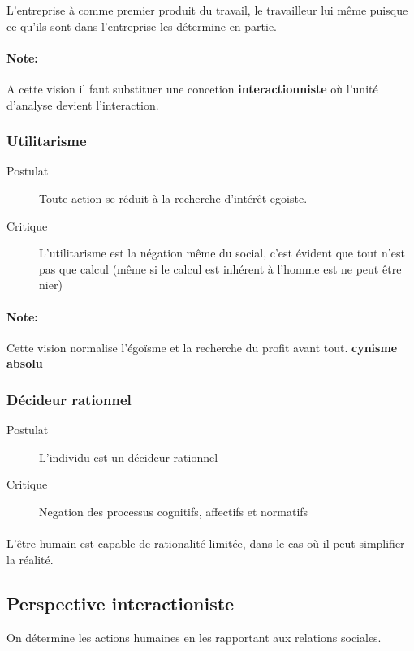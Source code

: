 \documentclass[11pt]{article} %
\begin{document}
L'entreprise à comme premier produit du travail, le travailleur lui même
puisque ce qu'ils sont dans l'entreprise les détermine en partie.

\paragraph{Note:} A cette vision il faut substituer une concetion
\textbf{interactionniste} où l'unité d'analyse devient l'interaction.

\subsubsection{Utilitarisme}

\begin{description}
    \item[Postulat] Toute action se réduit à la recherche d'intérêt egoiste.
    \item[Critique] L'utilitarisme est la négation même du social, c'est
        évident que tout n'est pas que calcul (même si le calcul est
        inhérent à l'homme est ne peut être nier)
\end{description}

\paragraph{Note: } Cette vision normalise l'égoïsme et la recherche du
profit avant tout. \textbf{cynisme absolu}

\subsubsection{Décideur rationnel}

\begin{description}
    \item[Postulat] L'individu est un décideur rationnel
    \item[Critique] Negation des processus cognitifs, affectifs et normatifs
\end{description}

\paragraph{} L'être humain est capable de rationalité limitée, dans le
cas où il peut simplifier la réalité.

\subsection{Perspective interactioniste}
On détermine les actions humaines en les rapportant aux relations
sociales. 
\end{document}
